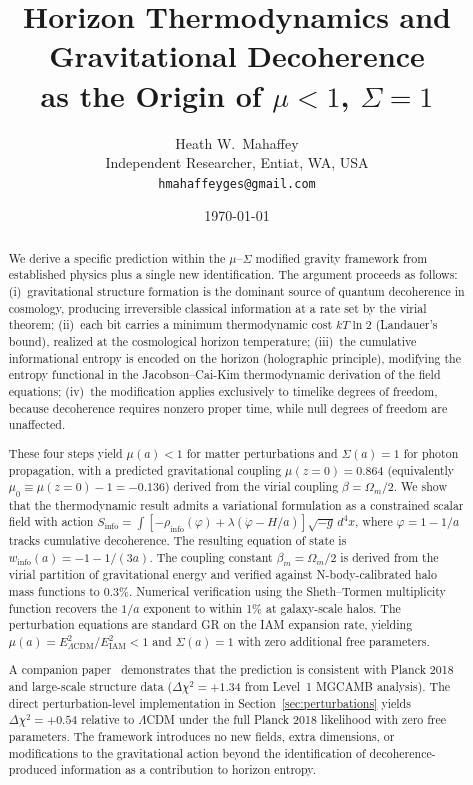 \documentclass[11pt]{article}
\title{Horizon Thermodynamics and Gravitational Decoherence\\
as the Origin of $\mu < 1$, $\Sigma = 1$}
\author{Heath W.\ Mahaffey\\
Independent Researcher, Entiat, WA, USA\\
\texttt{hmahaffeyges@gmail.com}}
\date{\today}
\begin{document}
\maketitle

\begin{abstract}
We derive a specific prediction within the $\mu$--$\Sigma$ modified gravity
framework from established physics plus a single new identification.  The
argument proceeds as follows:
(i)~gravitational structure formation is the dominant source of quantum
decoherence in cosmology, producing irreversible classical information at a
rate set by the virial theorem;
(ii)~each bit carries a minimum thermodynamic cost $kT\ln 2$ (Landauer's
bound), realized at the cosmological horizon temperature;
(iii)~the cumulative informational entropy is encoded on the horizon
(holographic principle), modifying the entropy functional in the
Jacobson--Cai-Kim thermodynamic derivation of the field equations;
(iv)~the modification applies exclusively to timelike degrees of freedom,
because decoherence requires nonzero proper time, while null degrees of
freedom are unaffected.

These four steps yield $\mu(a) < 1$ for matter perturbations and
$\Sigma(a) = 1$ for photon propagation, with a predicted gravitational coupling $\mu(z{=}0) = 0.864$
(equivalently $\mu_0 \equiv \mu(z{=}0) - 1 = -0.136$) derived from the
virial coupling $\beta = \Omega_m/2$.
We show that the thermodynamic result admits a variational formulation as
a constrained scalar field with action
$S_\mathrm{info} = \int[-\rho_\mathrm{info}(\varphi)
+ \lambda(\dot{\varphi} - H/a)]\sqrt{-g}\,d^4x$,
where $\varphi = 1 - 1/a$ tracks cumulative decoherence.
The resulting equation of state is $w_\mathrm{info}(a) = -1 - 1/(3a)$.
The coupling constant $\beta_m = \Omega_m/2$ is derived from the virial
partition of gravitational energy and verified against N-body-calibrated
halo mass functions to 0.3\%.  Numerical verification using the
Sheth--Tormen multiplicity function recovers the $1/a$ exponent to within
1\% at galaxy-scale halos.  The perturbation equations are standard GR on
the IAM expansion rate, yielding $\mu(a) = E^2_{\Lambda\mathrm{CDM}}/E^2_\mathrm{IAM} < 1$
and $\Sigma(a) = 1$ with zero additional free parameters.

A companion paper~\citep{Mahaffey2026obs} demonstrates that the prediction
is consistent with Planck 2018 and large-scale structure data
($\Delta\chi^2 = +1.34$ from Level~1 MGCAMB analysis).  The direct
perturbation-level implementation in Section~\ref{sec:perturbations} yields
$\Delta\chi^2 = +0.54$ relative to $\Lambda$CDM under the full Planck 2018
likelihood with zero free parameters.  The framework introduces no new fields,
extra dimensions, or modifications to the gravitational action beyond the
identification of decoherence-produced information as a contribution to
horizon entropy.
\end{abstract}
\end{document}
